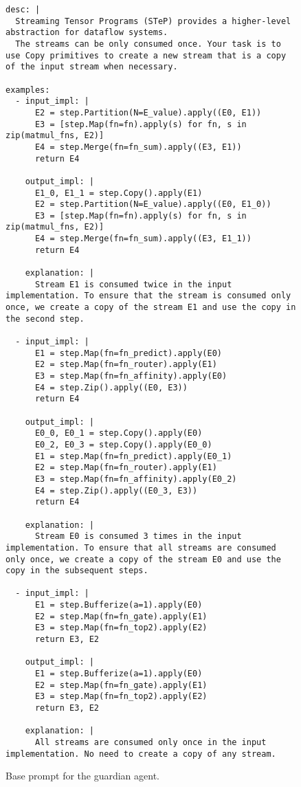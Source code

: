 \begin{figure}[htbp]
\centering
\begin{lstlisting}[language=step, mathescape=true, basicstyle=\scriptsize\ttfamily]
desc: |
  Streaming Tensor Programs (STeP) provides a higher-level abstraction for dataflow systems.
  The streams can be only consumed once. Your task is to use Copy primitives to create a new stream that is a copy of the input stream when necessary.

examples:
  - input_impl: |
      E2 = step.Partition(N=E_value).apply((E0, E1))
      E3 = [step.Map(fn=fn).apply(s) for fn, s in zip(matmul_fns, E2)]
      E4 = step.Merge(fn=fn_sum).apply((E3, E1))
      return E4
    
    output_impl: |
      E1_0, E1_1 = step.Copy().apply(E1)
      E2 = step.Partition(N=E_value).apply((E0, E1_0))
      E3 = [step.Map(fn=fn).apply(s) for fn, s in zip(matmul_fns, E2)]
      E4 = step.Merge(fn=fn_sum).apply((E3, E1_1))
      return E4
    
    explanation: |
      Stream E1 is consumed twice in the input implementation. To ensure that the stream is consumed only once, we create a copy of the stream E1 and use the copy in the second step.

  - input_impl: |
      E1 = step.Map(fn=fn_predict).apply(E0)
      E2 = step.Map(fn=fn_router).apply(E1)
      E3 = step.Map(fn=fn_affinity).apply(E0)
      E4 = step.Zip().apply((E0, E3))
      return E4

    output_impl: |
      E0_0, E0_1 = step.Copy().apply(E0)
      E0_2, E0_3 = step.Copy().apply(E0_0)
      E1 = step.Map(fn=fn_predict).apply(E0_1)
      E2 = step.Map(fn=fn_router).apply(E1)
      E3 = step.Map(fn=fn_affinity).apply(E0_2)
      E4 = step.Zip().apply((E0_3, E3))
      return E4
    
    explanation: |
      Stream E0 is consumed 3 times in the input implementation. To ensure that all streams are consumed only once, we create a copy of the stream E0 and use the copy in the subsequent steps.
  
  - input_impl: |
      E1 = step.Bufferize(a=1).apply(E0)
      E2 = step.Map(fn=fn_gate).apply(E1)
      E3 = step.Map(fn=fn_top2).apply(E2)
      return E3, E2
  
    output_impl: |
      E1 = step.Bufferize(a=1).apply(E0)
      E2 = step.Map(fn=fn_gate).apply(E1)
      E3 = step.Map(fn=fn_top2).apply(E2)
      return E3, E2

    explanation: |
      All streams are consumed only once in the input implementation. No need to create a copy of any stream.
\end{lstlisting}
\caption{Base prompt for the guardian agent.}
\label{fig:prompt-agent-2}
\end{figure}

